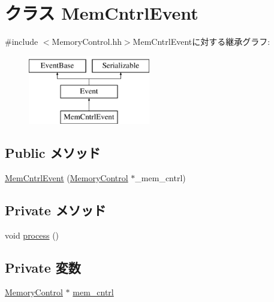 \hypertarget{classMemoryControl_1_1MemCntrlEvent}{
\section{クラス MemCntrlEvent}
\label{classMemoryControl_1_1MemCntrlEvent}
}


{\ttfamily \#include $<$MemoryControl.hh$>$}MemCntrlEventに対する継承グラフ:\begin{figure}[H]
\begin{center}
\leavevmode
\includegraphics[height=3cm]{classMemoryControl_1_1MemCntrlEvent}
\end{center}
\end{figure}
\subsection*{Public メソッド}
\begin{DoxyCompactItemize}
\item 
\hyperlink{classMemoryControl_1_1MemCntrlEvent_ae3167b7e2836b30c5faff458cab95248}{MemCntrlEvent} (\hyperlink{classMemoryControl_1_1MemoryControl}{MemoryControl} $\ast$\_\-mem\_\-cntrl)
\end{DoxyCompactItemize}
\subsection*{Private メソッド}
\begin{DoxyCompactItemize}
\item 
void \hyperlink{classMemoryControl_1_1MemCntrlEvent_a2e9c5136d19b1a95fc427e0852deab5c}{process} ()
\end{DoxyCompactItemize}
\subsection*{Private 変数}
\begin{DoxyCompactItemize}
\item 
\hyperlink{classMemoryControl_1_1MemoryControl}{MemoryControl} $\ast$ \hyperlink{classMemoryControl_1_1MemCntrlEvent_a9b07b40513d351ef4d737a15042c1935}{mem\_\-cntrl}
\end{DoxyCompactItemize}


